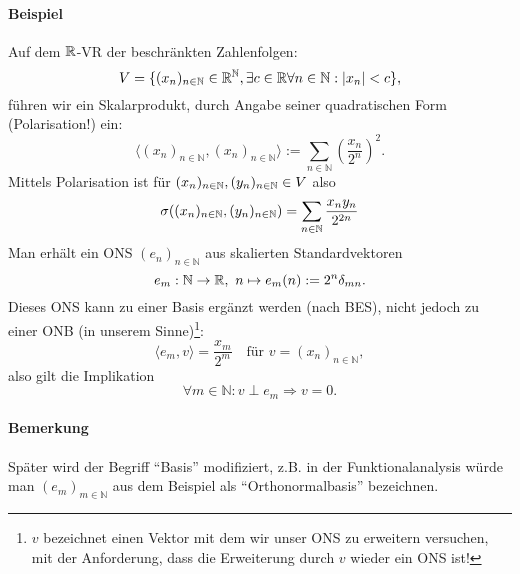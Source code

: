 \paragraph{Beispiel}
	Auf dem $ \mathbb{R} $-VR der beschränkten Zahlenfolgen:
		\[ V=\{(x_n)_{n\in \mathbb{N}}\in \mathbb{R}^\mathbb{N}, \exists c\in \mathbb{R}\forall n\in \mathbb{N}: |x_n|<c \}, \]
	führen wir ein Skalarprodukt, durch Angabe seiner quadratischen Form (Polarisation!) ein:
		\[ \langle (x_n)_{n\in \mathbb{N}},(x_n)_{n\in \mathbb{N}}\rangle := \sum_{n\in \mathbb{N}}\left(\frac{x_n}{2^n}\right)^2.  \]
		Mittels Polarisation ist für $(x_n)_{n \in \mathbb{N}},(y_n)_{n \in \mathbb{N}} \in V$ also
			\[\sigma((x_n)_{n \in \mathbb{N}},(y_n)_{n \in \mathbb{N}})=\sum_{n \in \mathbb{N}} \frac{x_ny_n}{2^{2n}}\]
	Man erhält ein ONS $ (e_n)_{n\in \mathbb{N}} $ aus skalierten Standardvektoren
		\[ e_m:\mathbb{N}\to \mathbb{R},\ n\mapsto e_m(n):= 2^n\delta_{mn}. \]
	Dieses ONS kann zu einer Basis ergänzt werden (nach BES), nicht jedoch zu einer ONB (in unserem Sinne)\footnote{$v$ bezeichnet einen Vektor mit dem wir unser ONS zu erweitern versuchen, mit der Anforderung, dass die Erweiterung durch $v$ wieder ein ONS ist!}:
		\[ \langle e_m, v\rangle = \frac{x_m}{2^m} \quad\text{für } v=(x_{n})_{n\in \mathbb{N}}, \]
	also gilt die Implikation
		\[ \forall m\in \mathbb{N}: v\perp e_m \Rightarrow v = 0. \]
\paragraph{Bemerkung}
	Später wird der Begriff "`Basis"' modifiziert, z.B. in der Funktionalanalysis würde man $ (e_m)_{m\in \mathbb{N}} $ aus dem Beispiel als "`Orthonormalbasis"' bezeichnen.